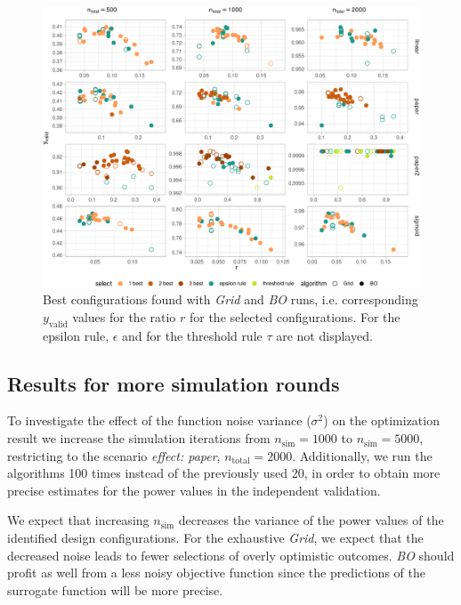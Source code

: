 \documentclass[bimj,fleqn]{w-art}
\theoremstyle{plain}
\theoremstyle{definition}
\begin{document}
\begin{figure}[htb]
\centering
\includegraphics[width=\linewidth]{generated/figures/plot_best_x.pdf}
\caption{Best configurations found with \emph{Grid} and \emph{BO} runs, i.e. corresponding $y_{\text{valid}}$ values for the ratio $r$ for the selected configurations. For the epsilon rule, $\epsilon$ and for the threshold rule $\tau$ are not displayed.}
\label{fig:plot_best_x}
\end{figure}

\subsection{Results for more simulation rounds}

To investigate the effect of the function noise variance ($\sigma^2$) on the optimization result we increase the simulation iterations from $n_\text{sim} = 1000$ to $n_\text{sim} = 5000$, restricting to the scenario \emph{effect: paper}, $n_{\text{total}} = 2000$.
Additionally, we run the algorithms 100 times instead of the previously used 20, in order to obtain more precise estimates for the power values in the independent validation.

We expect that increasing $n_\text{sim}$ decreases the variance of the power values of the identified design configurations.
For the exhaustive \emph{Grid}, we expect that the decreased noise leads to fewer selections of overly optimistic outcomes.
\emph{BO} should profit as well from a less noisy objective function since the predictions of the surrogate function will be more precise.
\end{document}
